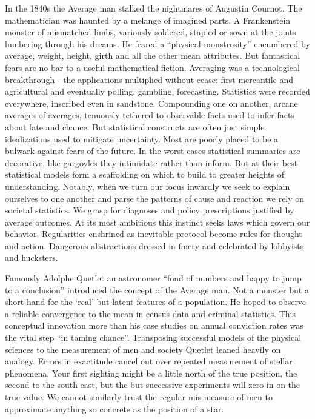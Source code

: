 \documentclass[]{tufte-book}
\theoremstyle{definition}
\theoremstyle{definition}
\theoremstyle{definition}
\theoremstyle{remark}
\begin{document}
In the 1840s the Average man stalked the nightmares of Augustin Cournot. The mathematician was haunted by a melange of imagined parts. A Frankenstein monster of mismatched limbs, variously soldered, stapled or sown at the joints lumbering through his dreams. He feared a ``physical monstrosity'' encumbered by average, weight, height, girth and all the other mean attributes. \citep{stigler2016seven} But fantastical fears are no bar to a useful mathematical fiction. Averaging was a technological breakthrough - the applications multiplied without cease: first mercantile and agricultural and eventually polling, gambling, forecasting. Statistics were recorded everywhere, inscribed even in sandstone. Compounding one on another, arcane averages of averages, tenuously tethered to observable facts used to infer facts about fate and chance. But statistical constructs are often just simple idealizations used to mitigate uncertainty. Most are poorly placed to be a bulwark against fears of the future. In the worst cases statistical summaries are decorative, like gargoyles they intimidate rather than inform. But at their best statistical models form a scaffolding on which to build to greater heights of understanding. Notably, when we turn our focus inwardly we seek to explain ourselves to one another and parse the patterns of cause and reaction we rely on societal statistics. We grasp for diagnoses and policy prescriptions justified by average outcomes. At its most ambitious this instinct seeks laws which govern our behavior. Regularities enshrined as inevitable protocol become rules for thought and action. Dangerous abstractions dressed in finery and celebrated by lobbyists and hucksters.

Famously Adolphe Quetlet an astronomer ``fond of numbers and happy to jump to a conclusion'' introduced the concept of the Average man. Not a monster but a short-hand for the `real' but latent features of a population. He hoped to observe a reliable convergence to the mean in census data and criminal statistics. This conceptual innovation more than his case studies on annual conviction rates was the vital step ``in taming chance''\citep{HackingTaming}. Transposing successful models of the physical sciences to the measurement of men and society Quetlet leaned heavily on analogy. Errors in exactitude cancel out over repeated measurement of stellar phenomena. Your first sighting might be a little north of the true position, the second to the south east, but the but successive experiments will zero-in on the true value. We cannot similarly trust the regular mis-measure of men to approximate anything so concrete as the position of a star.
\end{document}
